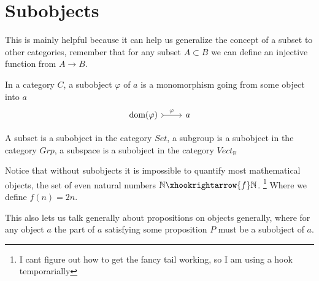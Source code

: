 \chapter{Subobjects}



This is mainly helpful because it can help us generalize the concept of a subset to other categories, remember that for any subset $A \subset B$ we can define an injective function from $A \rightarrow B$.
\begin{definition}[Subobject]
    In a category $C$, a subobject $\varphi$ of $a$ is a monomorphism going from some object into $a$
    \[\begin{tikzcd}
	\text{dom}(\varphi) & a
	\arrow["\varphi", tail, from=1-1, to=1-2]
\end{tikzcd}\]
\end{definition}
\begin{example}
    A subset is a subobject in the category $Set$, a subgroup is a subobject in the category $Grp$, a subspace is a subobject in the category $Vect_\mathbb{R}$
\end{example}
Notice that without subobjects it is impossible to quantify most mathematical objects, the set of even natural numbers $\mathbb{N} \xhookrightarrow{f} \mathbb{N}$. \footnote{I cant figure out how to get the fancy tail working, so I am using a hook temporarially} Where we define $f(n)=2n$.

This also lets us talk generally about propositions on objects generally, where for any object $a$ the part of $a$ satisfying some proposition $P$ must be a subobject of $a$. 

